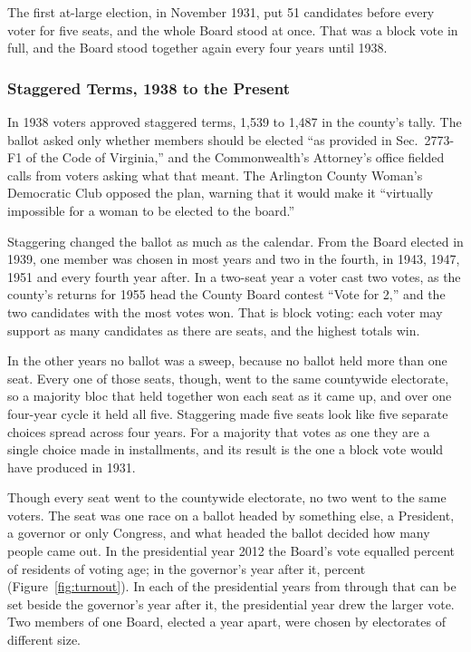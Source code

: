 The first at-large election, in November 1931, put 51 candidates before every voter
for five seats, and the whole Board stood at once.\autocite[67]{anderson1958}
That was a block vote in full, and the Board stood together again every four years
until 1938.

\subsubsection{Staggered Terms, 1938 to the Present}

In 1938 voters approved staggered terms, 1,539 to 1,487 in the county's
tally.\autocite[11]{arlingtonelections2021}\fnsep\autocite{sun1938referendum} The
ballot asked only whether members should be elected ``as provided in Sec.~2773-F1
of the Code of Virginia,'' and the Commonwealth's Attorney's office fielded calls
from voters asking what that meant. The Arlington County Woman's Democratic Club
opposed the plan, warning that it would make it ``virtually impossible for a woman
to be elected to the board.''\autocite{sun1938referendum}

Staggering changed the ballot as much as the calendar. From the Board elected in
1939, one member was chosen in most years and two in the fourth, in 1943, 1947,
1951 and every fourth year after.\autocite[37]{arlhist1967officials}
In a two-seat year a voter cast two votes, as the county's returns for 1955 head
the County Board contest ``Vote for 2,'' and the two candidates with the most votes
won.\autocite[28]{arlingtonelections2021} That is block voting: each voter may
support as many candidates as there are seats, and the highest totals win.

In the other years no ballot was a sweep, because no ballot held more than one seat.
Every one of those seats, though, went to the same countywide electorate, so a
majority bloc that held together won each seat as it came up, and over one
four-year cycle it held all five. Staggering made five seats look like five
separate choices spread across four years. For a majority that votes as one they
are a single choice made in installments, and its result is the one a block vote
would have produced in 1931.

Though every seat went to the countywide electorate, no two went to the same
voters. The seat was one race on a ballot headed by something else, a President, a
governor or only Congress, and what headed the ballot decided how many people came
out. In the presidential year 2012 the Board's vote equalled
\boardVoteTwoThousandTwelve{} percent of residents of voting age; in the governor's
year after it, \boardVoteTwoThousandThirteen{} percent
(Figure~\ref{fig:turnout}). In each of the \boardPairs{} presidential years from
\boardPairsFirst{} through \boardPairsLast{} that can be set beside the governor's
year after it, the presidential year drew the larger vote. Two members of one Board,
elected a year apart, were chosen by electorates of different size.

